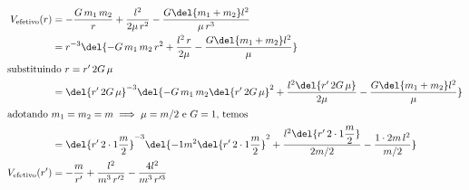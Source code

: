 \documentclass[]{IMTexam}
\begin{document}
\begin{questions}
	\begin{solution}
		\begin{align*}
			V_{\textup{efetivo}}(r)  & =-\dfrac{G\,m_1\,m_2}{r}+\dfrac{l^{2}}{2\mu\,r^{2}}-\dfrac{G\del{m_1+m_2}l^{2}}{\mu\,r^{3}}                                                                     \\
			                         & =r^{-3}\del{-G\,m_1\,m_2\,r^{2}+\dfrac{l^{2}\,r}{2\mu}-\dfrac{G\del{m_1+m_2}l^{2}}{\mu}}                                                                        \\
			\intertext{substituindo $ r=r'\,2G\,\mu $}
			                         & =\del{r'\,2G\,\mu}^{-3}\del{-G\,m_1\,m_2\del{r'\,2G\,\mu}^{2}+\dfrac{l^{2}\del{r'\,2G\,\mu}}{2\mu}-\dfrac{G\del{m_1+m_2}l^{2}}{\mu}}                            \\
			\intertext{adotando $ m_1=m_2=m\implies \mu=m/2 $ e $ G=1 $, temos}
			                         & =\del{r'\,2\cdot1\dfrac{m}{2}}^{-3}\del{-1m^{2}\del{r'\,2\cdot1\dfrac{m}{2}}^{2}+\dfrac{l^{2}\del{r'\,2\cdot1\dfrac{m}{2}}}{2m/2}-\dfrac{1\cdot2m\,l^{2}}{m/2}} \\
			V_{\textup{efetivo}}(r') & =-\dfrac{m}{r'}+\dfrac{l^{2}}{m^{3}\,r^{\prime2}}-\dfrac{4l^{2}}{m^{3}\,r^{\prime3}}
		\end{align*}
	\end{solution}

\end{questions}
\end{document}
